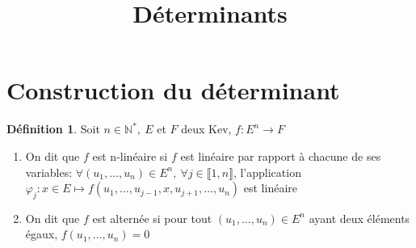 \documentclass[fleqn]{article}
\title{D\'eterminants}
\date{}
\theoremstyle{definition} \newtheorem*{defi}{D\'efinition}
\theoremstyle{definition} \newtheorem*{theo}{Th\'eor\`eme}
\theoremstyle{definition} \newtheorem*{coro}{Corollaire}
\theoremstyle{definition} \newtheorem*{nota}{Notation}
\theoremstyle{definition} \newtheorem*{vocab}{Vocabulaire}
\theoremstyle{remark} \newtheorem*{rqs}{Remarques}
\theoremstyle{definition} \newtheorem*{prop}{Propri\'et\'e}
\begin{document}
\maketitle

\section{Construction du d\'eterminant}
\begin{defi}
	Soit $n \in \mathbb{N}^*,\ E$ et $F$ deux Kev, $f: E^n \rightarrow F$
	\begin{enumerate}
		\item On dit que $f$ est n-lin\'eaire si $f$ est lin\'eaire par rapport \`a chacune de ses variables:
		$\forall (u_1, \hdots, u_n) \in E^n,\ \forall j \in \llbracket 1,n \rrbracket $, l'application $\varphi_j: x \in E \mapsto f(u_1, \hdots, u_{j-1},
		x, u_{j+1}, \hdots, u_n)$ est lin\'eaire
		\item On dit que $f$ est altern\'ee si pour tout $(u_1, \hdots, u_n) \in E^n$ ayant deux \'el\'ements \'egaux, $f(u_1, \hdots, u_n) = 0$
	\end{enumerate}
\end{defi}
\end{document}
